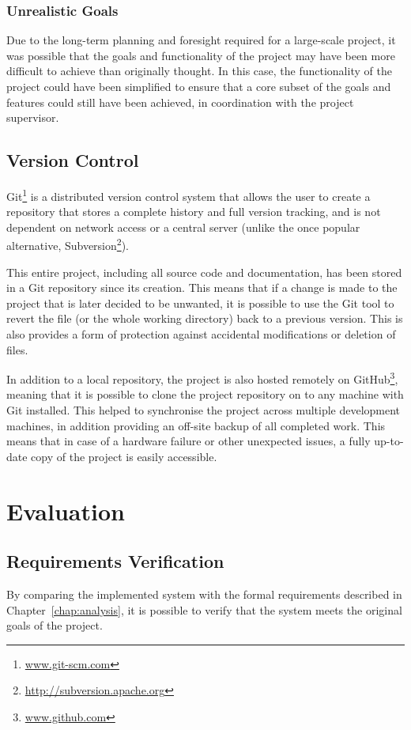 \documentclass[11pt,a4paper]{report}
\begin{document}
\subsection{Unrealistic Goals}
Due to the long-term planning and foresight required for a large-scale project, it was possible that the goals and functionality of the project may have been more difficult to achieve than originally thought. In this case, the functionality of the project could have been simplified to ensure that a core subset of the goals and features could still have been achieved, in coordination with the project supervisor.

\section{Version Control}
\label{sec:git}
Git\footnote{\url{www.git-scm.com}} is a distributed version control system that allows the user to create a repository that stores a complete history and full version tracking, and is not dependent on network access or a central server (unlike the once popular alternative, Subversion\footnote{\url{http://subversion.apache.org}}).

This entire project, including all source code and documentation, has been stored in a Git repository since its creation. This means that if a change is made to the project that is later decided to be unwanted, it is possible to use the Git tool to revert the file (or the whole working directory) back to a previous version. This is also provides a form of protection against accidental modifications or deletion of files.

In addition to a local repository, the project is also hosted remotely on GitHub\footnote{\url{www.github.com}}, meaning that it is possible to clone the project repository on to any machine with Git installed. This helped to synchronise the project across multiple development machines, in addition providing an off-site backup of all completed work. This means that in case of a hardware failure or other unexpected issues, a fully up-to-date copy of the project is easily accessible.

\pagebreak

\chapter{Evaluation}
\label{chap:evaluation}

\section{Requirements Verification}
By comparing the implemented system with the formal requirements described in Chapter~\ref{chap:analysis}, it is possible to verify that the system meets the original goals of the project.
\end{document}
